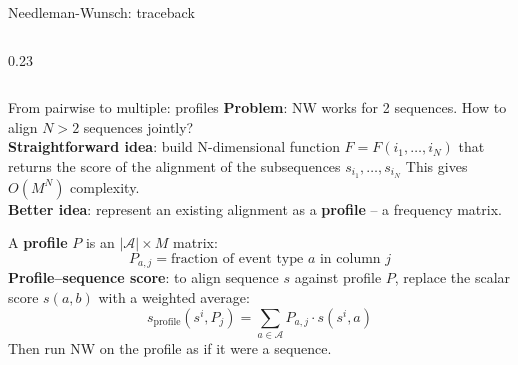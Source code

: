 \documentclass[aspectratio=169,t]{beamer}
\begin{document}
\begin{frame}[shrink=5]{Needleman-Wunsch: traceback}
\begin{columns}[T]
\begin{column}{0.23\textwidth}
\begin{center}
      \end{center}
    \end{column}
  \end{columns}
\end{frame}

\begin{frame}[shrink=5]{From pairwise to multiple: profiles}
  \textbf{Problem}: NW works for 2 sequences. How to align $N > 2$ sequences jointly?\\[0.2cm]
  \textbf{Straightforward idea}: build N-dimensional function $F = F(i_1, \ldots, i_N)$ that returns the score of the alignment of the subsequences $s_{i_1}, \ldots, s_{i_N}$ This gives $O(M^N)$ complexity.\\[0.2cm]
  \textbf{Better idea}: represent an existing alignment as a \textbf{profile} -- a frequency matrix.
  \vspace{0.3cm}

  A \textbf{profile} $P$ is an $|\mathcal{A}| \times M$ matrix:
  \[
    P_{a,j} = \text{fraction of event type } a \text{ in column } j
  \]
  \textbf{Profile–sequence score}: to align sequence $s$ against profile $P$, replace the scalar score $s(a, b)$ with a weighted average:
  \[
    s_{\text{profile}}(s^i, P_j) = \sum_{a \in \mathcal{A}} P_{a,j} \cdot s(s^i, a)
  \]
  Then run NW on the profile as if it were a sequence.
\end{frame}
\end{document}

